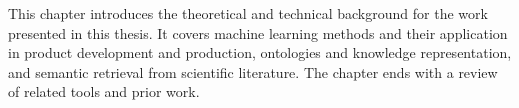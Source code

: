 This chapter introduces the theoretical and technical background for the work 
presented in this thesis. 
It covers machine learning methods and their application in product development 
and production, ontologies and knowledge representation, and semantic retrieval 
from scientific literature. 
The chapter ends with a review of related tools and prior work.






